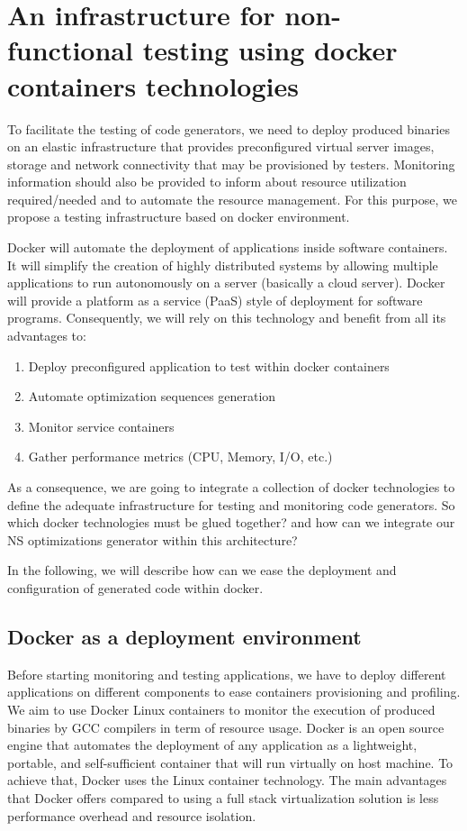 \section{An infrastructure for non-functional testing using docker containers
technologies}

To facilitate the testing of code generators, we need to deploy produced binaries on an elastic infrastructure that
provides preconfigured virtual server images, storage and network connectivity that may be
provisioned by testers. Monitoring information should also be provided to inform about resource utilization required/needed and to automate the resource management. For this purpose, we propose a testing infrastructure based on docker environment. 

Docker will automate the deployment of applications inside software containers. It will simplify the creation
of highly distributed systems by allowing multiple applications to run autonomously on a server
(basically a cloud server). Docker will provide a platform as a service (PaaS) style of
deployment for software programs. Consequently, we will rely on this technology and benefit from all its advantages to:
\begin{enumerate}
	\item Deploy preconfigured application to test within docker containers
	\item Automate optimization sequences generation
	\item Monitor service containers
	\item Gather performance metrics (CPU, Memory, I/O, etc.)
\end{enumerate}
As a consequence, we are going to integrate a collection of docker technologies to define the adequate infrastructure for testing and monitoring code generators. So which docker technologies must be glued together? and how can we integrate our NS optimizations generator within this architecture?

In the following,  we will describe how can we ease the deployment and configuration of generated code within docker.
\subsection{Docker as a deployment environment}
Before starting monitoring and testing applications, we have to deploy different applications on different components to ease containers provisioning and profiling.
We aim to use Docker Linux containers to monitor the execution of produced binaries by GCC compilers in term of resource usage. 
Docker is an open source engine that automates the deployment of any application as a
lightweight, portable, and self-sufficient container that will run virtually on host machine. To achieve that, Docker uses the Linux container technology. The main advantages that Docker offers compared to using a full stack virtualization solution is less performance overhead and resource isolation.

